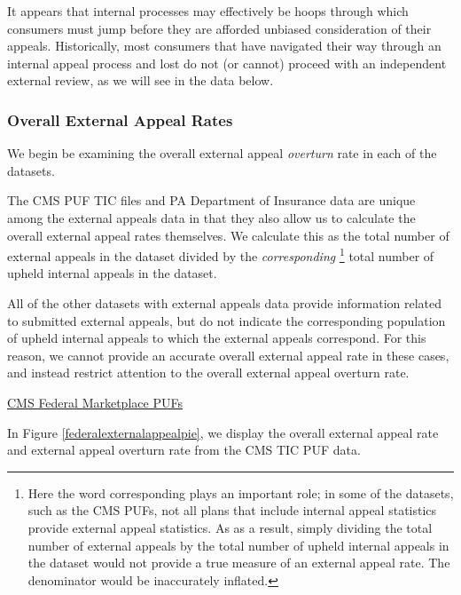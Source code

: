 \documentclass[12pt, a4paper,twoside,parskip=full]{report}
\theoremstyle{plain} %
\theoremstyle{definition} %
\theoremstyle{remark} %
\numberwithin{equation}{chapter}
\begin{document}
		It appears that internal processes may effectively be hoops through which consumers must jump before they are afforded unbiased consideration of their appeals. Historically, most consumers that have navigated their way through an internal appeal process and lost do not (or cannot) proceed with an independent external review, as we will see in the data below.
		
		\subsubsection{Overall External Appeal Rates}
		
		We begin be examining the overall external appeal \emph{overturn} rate in each of the datasets.
		
		The CMS PUF TIC files and PA Department of Insurance data are unique among the external appeals data in that they also allow us to calculate the overall external appeal rates themselves. We calculate this as the total number of external appeals in the dataset divided by the \emph{corresponding} \footnote{Here the word corresponding plays an important role; in some of the datasets, such as the CMS PUFs, not all plans that include internal appeal statistics provide external appeal statistics. As as a result, simply dividing the total number of external appeals by the total number of upheld internal appeals in the dataset would not provide a true measure of an external appeal rate. The denominator would be inaccurately inflated.} total number of upheld internal appeals in the dataset.
		
		All of the other datasets with external appeals data provide information related to submitted external appeals, but do not indicate the corresponding population of upheld internal appeals to which the external appeals correspond. For this reason, we cannot provide an accurate overall external appeal rate in these cases, and instead restrict attention to the overall external appeal overturn rate.
		
		\underline{CMS Federal Marketplace PUFs}
		
		In Figure \ref{federalexternalappealpie}, we display the overall external appeal rate and external appeal overturn rate from the CMS TIC PUF data.
		
\end{document}
